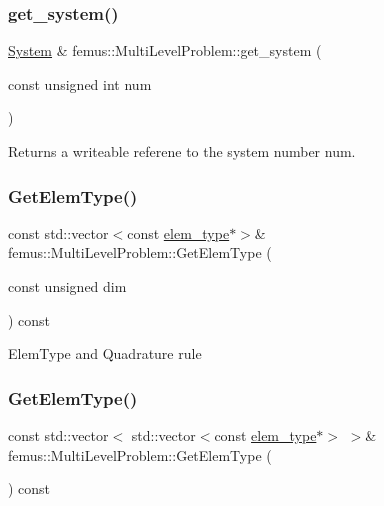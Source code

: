 \subsubsection{\texorpdfstring{get\+\_\+system()}{get\_system()}\hspace{0.1cm}{\footnotesize\ttfamily [8/8]}}
{\footnotesize\ttfamily \mbox{\hyperlink{classfemus_1_1_system}{System}} \& femus\+::\+Multi\+Level\+Problem\+::get\+\_\+system (\begin{DoxyParamCaption}\item[{const unsigned int}]{num }\end{DoxyParamCaption})\hspace{0.3cm}{\ttfamily [inline]}}

\begin{DoxyReturn}{Returns}
a writeable referene to the system number {\ttfamily num}. 
\end{DoxyReturn}
\mbox{\label{classfemus_1_1_multi_level_problem_ac257887f78cc95c8fd1ea1e720cb57f2}} 
\subsubsection{\texorpdfstring{Get\+Elem\+Type()}{GetElemType()}\hspace{0.1cm}{\footnotesize\ttfamily [1/2]}}
{\footnotesize\ttfamily const std\+::vector$<$const \mbox{\hyperlink{classfemus_1_1elem__type}{elem\+\_\+type}}$\ast$$>$\& femus\+::\+Multi\+Level\+Problem\+::\+Get\+Elem\+Type (\begin{DoxyParamCaption}\item[{const unsigned}]{dim }\end{DoxyParamCaption}) const\hspace{0.3cm}{\ttfamily [inline]}}

Elem\+Type and Quadrature rule \mbox{\label{classfemus_1_1_multi_level_problem_a71d1a701f785027bd03142ab78e5990c}} 
\subsubsection{\texorpdfstring{Get\+Elem\+Type()}{GetElemType()}\hspace{0.1cm}{\footnotesize\ttfamily [2/2]}}
{\footnotesize\ttfamily const std\+::vector$<$ std\+::vector$<$const \mbox{\hyperlink{classfemus_1_1elem__type}{elem\+\_\+type}}$\ast$$>$ $>$\& femus\+::\+Multi\+Level\+Problem\+::\+Get\+Elem\+Type (\begin{DoxyParamCaption}{ }\end{DoxyParamCaption}) const\hspace{0.3cm}{\ttfamily [inline]}}

